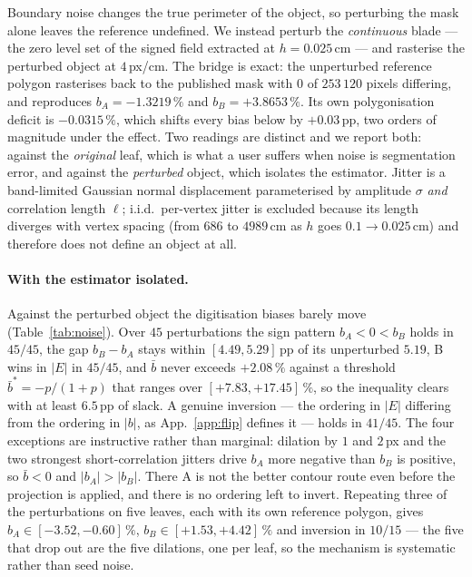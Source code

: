 \documentclass{article}
\newcommand{\pct}[1]{$#1\,\%$}
\begin{document}
Boundary noise changes the true perimeter of the object, so perturbing the mask alone leaves the
reference undefined. We instead perturb the \emph{continuous} blade --- the zero level set of the
signed field extracted at $h = 0.025$\,cm --- and rasterise the perturbed object at $4$\,px/cm. The
bridge is exact: the unperturbed reference polygon rasterises back to the published mask with $0$ of
$253\,120$ pixels differing, and reproduces $b_A = -1.3219\,\%$ and $b_B = +3.8653\,\%$. Its own
polygonisation deficit is $-0.0315\,\%$, which shifts every bias below by $+0.03$\,pp, two orders of
magnitude under the effect. Two readings are distinct and we report both: against the
\emph{original} leaf, which is what a user suffers when noise is segmentation error, and against
the \emph{perturbed} object, which isolates the estimator. Jitter is a band-limited Gaussian normal
displacement parameterised by amplitude $\sigma$ \emph{and} correlation length $\ell$; i.i.d.\
per-vertex jitter is excluded because its length diverges with vertex spacing (from $686$ to
$4989$\,cm as $h$ goes $0.1 \to 0.025$\,cm) and therefore does not define an object at all.

\paragraph{With the estimator isolated.} Against the perturbed object the digitisation biases barely
move (Table~\ref{tab:noise}). Over $45$ perturbations the sign pattern $b_A < 0 < b_B$ holds in
$45/45$, the gap $b_B - b_A$ stays within $[4.49, 5.29]$\,pp of its unperturbed $5.19$, B wins in
$|E|$ in $45/45$, and $\bar b$ never exceeds \pct{+2.08} against a threshold
$\bar b^{*} = -p/(1+p)$ that ranges over $[+7.83, +17.45]\,\%$, so the inequality clears with at
least $6.5$\,pp of slack. A genuine inversion --- the ordering in $|E|$ differing from the ordering
in $|b|$, as App.~\ref{app:flip} defines it --- holds in $41/45$. The four exceptions are
instructive rather than marginal: dilation by $1$ and $2$\,px and the two strongest
short-correlation jitters drive $b_A$ more negative than $b_B$ is positive, so $\bar b < 0$ and
$|b_A| > |b_B|$. There A is not the better contour route even before the projection is applied, and
there is no ordering left to invert. Repeating three of the perturbations on five leaves, each with
its own reference polygon, gives $b_A \in [-3.52, -0.60]\,\%$, $b_B \in [+1.53, +4.42]\,\%$ and
inversion in $10/15$ --- the five that drop out are the five dilations, one per leaf, so the
mechanism is systematic rather than seed noise.
\end{document}
